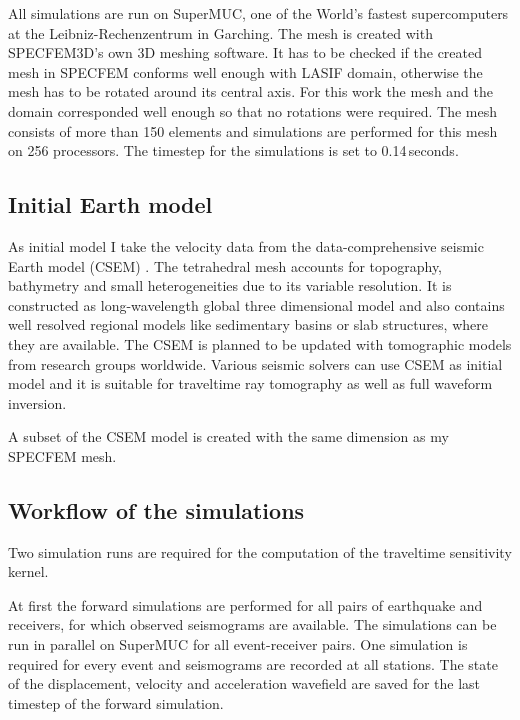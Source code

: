 All simulations are run on SuperMUC, one of the World's fastest supercomputers at the Leibniz-Rechenzentrum in Garching. 
The mesh is created with SPECFEM3D's own 3D meshing software. 
It has to be checked if the created mesh in SPECFEM conforms well enough with LASIF domain, otherwise the mesh has to 
be rotated around its central axis.
For this work the mesh and the domain corresponded well enough so that no rotations were required.
The mesh consists of more than 150 %
elements and simulations are performed for this mesh on 256 processors.
The timestep for the simulations is set to 0.14$\,$seconds.  



\subsection{Initial Earth model}

As initial model I take the velocity data from the data-comprehensive seismic Earth model (CSEM) \citep{Afanasiev2014}.
The tetrahedral mesh accounts for topography, bathymetry and small heterogeneities due to its variable resolution.
It is constructed as long-wavelength global three dimensional model and also contains well resolved regional models
like sedimentary basins or slab structures, where they are available.
The CSEM is planned to be updated with tomographic models from research groups worldwide.
Various seismic solvers can use CSEM as initial model and it is suitable for traveltime ray tomography as well as
full waveform inversion.

A subset of the CSEM model is created with the same dimension as my SPECFEM mesh. 



\subsection{Workflow of the simulations}

Two simulation runs are required for the computation of the traveltime sensitivity kernel.

At first the forward simulations are performed for all pairs of earthquake and receivers, for which observed seismograms are available.
The simulations can be run in parallel on SuperMUC for all event-receiver pairs. 
One simulation is required for every event and seismograms are recorded at all stations. %
The state of the displacement, velocity and acceleration wavefield are saved for the last timestep of the forward simulation.

